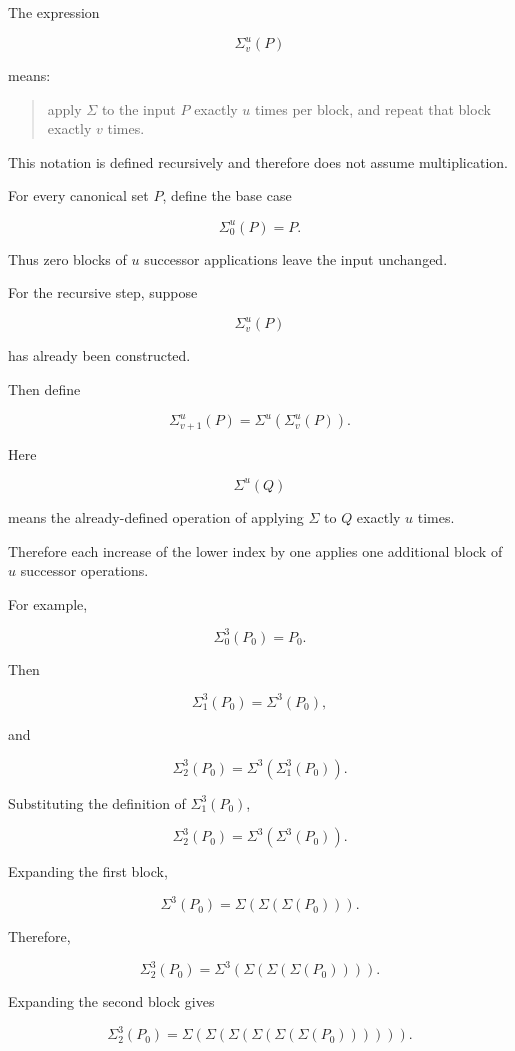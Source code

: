 \documentclass[12pt]{article}
\begin{document}
The expression

\[
\Sigma^u_v(P)
\]

means:

\begin{quote}
apply \(\Sigma\) to the input \(P\) exactly \(u\) times per block, and repeat that block exactly \(v\) times.
\end{quote}

This notation is defined recursively and therefore does not assume multiplication.

For every canonical set \(P\), define the base case

\[
\boxed{
\Sigma^u_0(P)=P.
}
\]

Thus zero blocks of \(u\) successor applications leave the input unchanged.

For the recursive step, suppose

\[
\Sigma^u_v(P)
\]

has already been constructed.

Then define

\[
\boxed{
\Sigma^u_{v+1}(P)
=
\Sigma^u
\left(
\Sigma^u_v(P)
\right).
}
\]

Here

\[
\Sigma^u(Q)
\]

means the already-defined operation of applying \(\Sigma\) to \(Q\) exactly \(u\) times.

Therefore each increase of the lower index by one applies one additional block of \(u\) successor operations.

For example,

\[
\Sigma^3_0(P_0)=P_0.
\]

Then

\[
\Sigma^3_1(P_0)
=
\Sigma^3(P_0),
\]

and

\[
\Sigma^3_2(P_0)
=
\Sigma^3
\left(
\Sigma^3_1(P_0)
\right).
\]

Substituting the definition of \(\Sigma^3_1(P_0)\),

\[
\Sigma^3_2(P_0)
=
\Sigma^3
\left(
\Sigma^3(P_0)
\right).
\]

Expanding the first block,

\[
\Sigma^3(P_0)
=
\Sigma(\Sigma(\Sigma(P_0))).
\]

Therefore,

\[
\Sigma^3_2(P_0)
=
\Sigma^3
\left(
\Sigma(\Sigma(\Sigma(P_0)))
\right).
\]

Expanding the second block gives

\[
\Sigma^3_2(P_0)
=
\Sigma(\Sigma(\Sigma(\Sigma(\Sigma(\Sigma(P_0)))))).
\]
\end{document}
